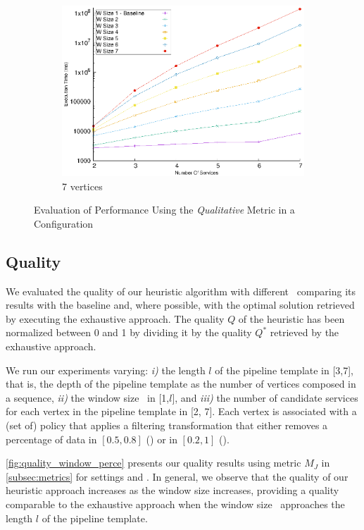 \begin{figure}[!t]
\begin{subfigure}{0.45\textwidth}
        \includegraphics[width=\textwidth]{Images/graphs/window_time_performance_qualitative_n7_s7_50_80_n7}
        \caption{7 vertices}
        \label{fig:time_window_perce_wide_7n}
      \end{subfigure}
      \caption{{\color{OurColor2}Evaluation of Performance Using the \emph{Qualitative} Metric in a \average Configuration}}
      \label{fig:time_window_perce_average}
    \end{figure}

    \subsection{Quality}\label{subsec:experiments_quality}
    We evaluated the quality of our heuristic algorithm with different \windowsize\ comparing its results with the baseline and, where possible, with the optimal solution retrieved by executing the exhaustive approach.
    The quality $Q$ of the heuristic has been normalized between 0 and 1 by dividing it by the quality $Q^*$ retrieved by the exhaustive approach.

    We run our experiments varying: \emph{i)} the length $l$ of the pipeline template in [3,7], that is, the depth of the pipeline template as the number of vertices composed in a sequence, \emph{ii)} the window size \windowsize\ in [1,$l$], and \emph{iii)} the number of candidate services for each vertex in the pipeline template in [2, 7]. Each vertex is associated with a (set of) policy that applies a filtering transformation that either removes a percentage of data in $[0.5,0.8]$ (\average) or in $[0.2,1]$ (\wide).

      {\color{OurColor2}\cref{fig:quality_window_perce} presents}  our quality results using metric $M_J$ in \cref{subsec:metrics} for settings \wide and \average.
    In general, we observe that the quality of our heuristic approach increases as the window size increases, providing a quality comparable to the exhaustive approach when the window size \windowsize\ approaches the length $l$ of the pipeline template.

